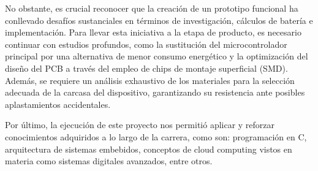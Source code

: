 No obstante, es crucial reconocer que la creación de un prototipo funcional ha conllevado desafíos sustanciales en términos de investigación, cálculos de batería e implementación. Para llevar esta iniciativa a la etapa de producto, es necesario continuar con estudios profundos, como la sustitución del microcontrolador principal por una alternativa de menor consumo energético y la optimización del diseño del PCB a través del empleo de chips de montaje superficial (SMD). Además, se requiere un análisis exhaustivo de los materiales para la selección adecuada de la carcasa del dispositivo, garantizando su resistencia ante posibles aplastamientos accidentales.

Por último, la ejecución de este proyecto nos permitió aplicar y reforzar conocimientos adquiridos a lo largo de la carrera, como son: programación en C, arquitectura de sistemas embebidos, conceptos de cloud computing vistos en materia como sistemas digitales avanzados, entre otros.
